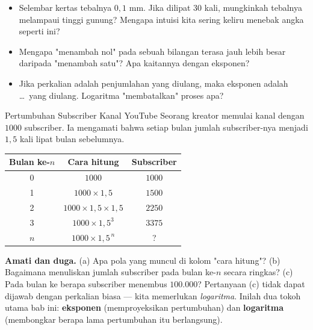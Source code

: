 \documentclass[11pt,a4paper]{report}
\theoremstyle{gaya}
\begin{document}
\begin{pemantik}
\begin{itemize}[leftmargin=*,topsep=2pt]
  \item Selembar kertas tebalnya $0{,}1$ mm. Jika dilipat 30 kali, mungkinkah tebalnya melampaui tinggi gunung? Mengapa intuisi kita sering keliru menebak angka seperti ini?
  \item Mengapa "menambah nol" pada sebuah bilangan terasa jauh lebih besar daripada "menambah satu"? Apa kaitannya dengan eksponen?
  \item Jika perkalian adalah penjumlahan yang diulang, maka eksponen adalah \dots\ yang diulang. Logaritma "membatalkan" proses apa?
\end{itemize}
\end{pemantik}

\begin{studikasus}{Pertumbuhan Subscriber Kanal YouTube}
Seorang kreator memulai kanal dengan $1000$ subscriber. Ia mengamati bahwa setiap bulan jumlah subscriber-nya menjadi $1{,}5$ kali lipat bulan sebelumnya.

\smallskip
\begin{center}
\begin{tabular}{c|c|c}
\toprule
Bulan ke-$n$ & Cara hitung & Subscriber \\
\midrule
0 & $1000$ & $1000$\\
1 & $1000 \times 1{,}5$ & $1500$\\
2 & $1000 \times 1{,}5 \times 1{,}5$ & $2250$\\
3 & $1000 \times 1{,}5^3$ & $3375$\\
$n$ & $1000 \times 1{,}5^{\,n}$ & ? \\
\bottomrule
\end{tabular}
\end{center}

\smallskip
\textbf{ Amati dan duga.} (a) Apa pola yang muncul di kolom "cara hitung"? (b) Bagaimana menuliskan jumlah subscriber pada bulan ke-$n$ secara ringkas? (c) Pada bulan ke berapa subscriber menembus $100.000$? Pertanyaan (c) tidak dapat dijawab dengan perkalian biasa --- kita memerlukan \emph{logaritma}. Inilah dua tokoh utama bab ini: \textbf{eksponen} (memproyeksikan pertumbuhan) dan \textbf{logaritma} (membongkar berapa lama pertumbuhan itu berlangsung).
\end{studikasus}
\end{document}
